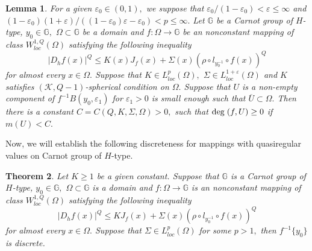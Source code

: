 \documentclass[11pt,twoside]{article}
\newtheorem{thm}{Theorem}[section]
\newtheorem{lem}[thm]{Lemma}
\theoremstyle{definition}
\theoremstyle{remark}
\begin{document}
\begin{lem} \label{987887}
 For a given $\varepsilon_{0}\in(0,1),$ we suppose that $\varepsilon_{0}/(1-\varepsilon_{0})<\varepsilon\leq\infty$ and $(1-\varepsilon_{0})(1+\varepsilon)/((1-\varepsilon_{0})\varepsilon-\varepsilon_{0})<p\leq\infty.$ Let $\mathbb{G}$ be a Carnot group of $H$-type,  $y_{0}\in\mathbb{G},$ $\Omega\subset\mathbb{G}$ be a domain and $f:\Omega\rightarrow \mathbb{G}$ be an nonconstant mapping of class $W_{loc}^{1,Q}(\Omega)$ satisfying  the following inequality
$$\vert D_{h}f(x)\vert^{Q}\leq K(x)J_{f}(x)+\Sigma(x)(\rho\circ l_{y_{0}^{-1}}\circ f(x))^{Q}$$
for almost every $x\in\Omega.$ Suppose that $K\in L_{loc}^{p}(\Omega),$  $\Sigma\in L_{loc}^{1+\varepsilon}(\Omega)$  and $K$ satisfies $(\mathcal{K},Q-1)$-spherical  condition on $\Omega.$ Suppose that $U$ is a non-empty component of $f^{-1}B(y_{0},\varepsilon_{1})$ for $\varepsilon_{1}>0$ is small enough such that $\overline{U}\subset\Omega.$ Then there is a constant $C=C(Q,K,\Sigma,\Omega)>0,$ such that ${\rm deg}\;(f,U)\geq0$ if $m(U)<C.$
\end{lem}
Now, we will establish the following discreteness for mappings with quasiregular values on Carnot group of $H$-type.
\begin{thm}\label{theorem9009}
Let $K\geq1$ be a given constant. Suppose that $\mathbb{G}$ is a Carnot group of $H$-type,  $y_{0}\in\mathbb{G},$ $\Omega\subset\mathbb{G}$ is a domain and $f:\Omega\rightarrow \mathbb{G}$ is an nonconstant mapping of class $W_{loc}^{1,Q}(\Omega)$ satisfying  the following inequality
$$\vert D_{h}f(x)\vert^{Q}\leq KJ_{f}(x)+\Sigma(x)(\rho\circ l_{y_{0}^{-1}}\circ f(x))^{Q}$$
for almost every $x\in\Omega.$ Suppose that $\Sigma\in L_{loc}^{p}(\Omega)$ for some $p>1,$ then $f^{-1}\{y_{0}\}$ is discrete.
\end{thm}
\end{document}
